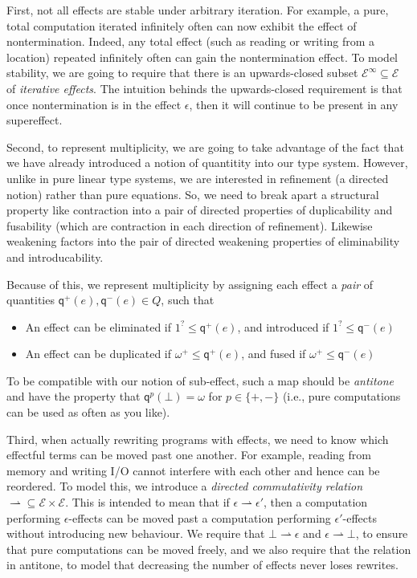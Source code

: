 \documentclass[acmsmall,screen,review]{acmart}
\newcommand{\mc}[1]{\ensuremath{\mathcal{#1}}}
\newcommand{\ms}[1]{\ensuremath{\mathsf{#1}}}
\newcommand{\rightmove}{\rightharpoonup}
\newcommand{\delq}{1^?}
\newcommand{\cpyq}{\omega^+}
\newcommand{\topq}{\omega}
\newcommand{\alquant}{\ms{q}}
\begin{document}
First, not all effects are stable under arbitrary iteration. For example, a
pure, total computation iterated infinitely often can now exhibit the
effect of nontermination. Indeed, any total effect (such as reading or
writing from a location) repeated infinitely often can gain the
nontermination effect. To model stability, we are going to require that there is an
upwards-closed subset $\mc{E}^\infty \subseteq \mc{E}$ of
\emph{iterative effects}. The intuition behinds the upwards-closed
requirement is that once nontermination is in the effect $\epsilon$,
then it will continue to be present in any supereffect.

Second, to represent multiplicity, we are going to take advantage of
the fact that we have already introduced a notion of quantitity into
our type system.  However, unlike in pure linear type systems, we are
interested in refinement (a directed notion) rather than pure
equations.  So, we need to break apart a structural property like
contraction into a pair of directed properties of duplicability and
fusability (which are contraction in each direction of
refinement). Likewise weakening factors into the pair of directed
weakening properties of eliminability and introducability.

Because of this, we represent multiplicity by assigning each effect a \emph{pair} of quantities
$\alquant^+(e), \alquant^-(e) \in Q$, such that
\begin{itemize}
  \item An effect can be eliminated if $\delq \leq \alquant^+(e)$, and introduced if $\delq \leq
  \alquant^-(e)$
  \item An effect can be duplicated if $\cpyq \leq \alquant^+(e)$, and fused if $\cpyq \leq
  \alquant^-(e)$
\end{itemize}
To be compatible with our notion of sub-effect, such a map should be \emph{antitone} and have
the property that $\alquant^p(\bot) = \topq$ for $p \in \{+, -\}$ (i.e., pure computations can
be used as often as you like).

Third, when actually rewriting programs with effects, we need to know which effectful terms
can be moved past one another. For example, reading from memory and writing I/O cannot interfere
with each other and hence can be reordered. To model this, we introduce a \emph{directed
  commutativity relation} $\rightmove \subseteq \mc{E} \times \mc{E}$. This is intended to
mean that if $\epsilon \rightmove \epsilon'$, then a computation performing $\epsilon$-effects
can be moved past a computation performing $\epsilon'$-effects without introducing new
behaviour. We require that $\bot \rightmove \epsilon$ and $\epsilon \rightmove \bot$, to
ensure that pure computations can be moved freely, and we also require that the relation
in antitone, to model that decreasing the number of effects never loses rewrites. 
\end{document}
